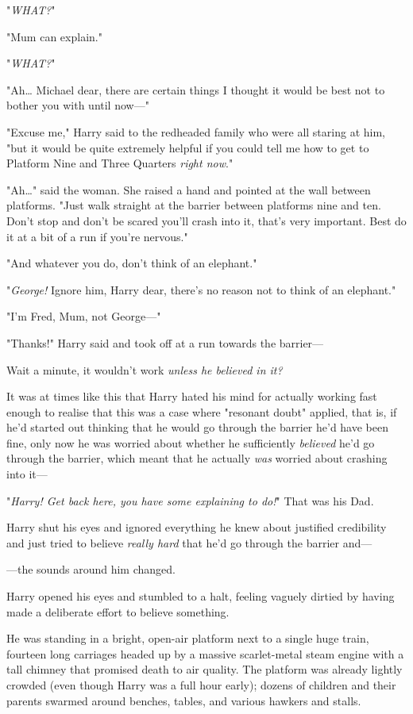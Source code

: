 "\emph{WHAT?}"

"Mum can explain."

"\emph{WHAT?}"

"Ah{\ldots} Michael dear, there are certain things I thought it would be best 
not to bother you with until now---"

"Excuse me," Harry said to the redheaded family who were all staring at him, 
"but it would be quite extremely helpful if you could tell me how to get to 
Platform Nine and Three Quarters \emph{right now}."

"Ah{\ldots}" said the woman. She raised a hand and pointed at the wall between 
platforms. "Just walk straight at the barrier between platforms nine and ten. 
Don't stop and don't be scared you'll crash into it, that's very important. 
Best do it at a bit of a run if you're nervous."

"And whatever you do, don't think of an elephant."

"\emph{George!} Ignore him, Harry dear, there's no reason not to think of an 
elephant."

"I'm Fred, Mum, not George---"

"Thanks!" Harry said and took off at a run towards the barrier---

Wait a minute, it wouldn't work \emph{unless he believed in it?}

It was at times like this that Harry hated his mind for actually working fast 
enough to realise that this was a case where "resonant doubt" applied, that is, 
if he'd started out thinking that he would go through the barrier he'd have 
been fine, only now he was worried about whether he sufficiently 
\emph{believed} he'd go through the barrier, which meant that he actually 
\emph{was} worried about crashing into it---

"\emph{Harry! Get back here, you have some explaining to do!}" That was his Dad.

Harry shut his eyes and ignored everything he knew about justified credibility 
and just tried to believe \emph{really hard} that he'd go through the barrier 
and---

---the sounds around him changed.

Harry opened his eyes and stumbled to a halt, feeling vaguely dirtied by having 
made a deliberate effort to believe something.

He was standing in a bright, open-air platform next to a single huge train, 
fourteen long carriages headed up by a massive scarlet-metal steam engine with 
a tall chimney that promised death to air quality. The platform was already 
lightly crowded (even though Harry was a full hour early); dozens of children 
and their parents swarmed around benches, tables, and various hawkers and 
stalls.

